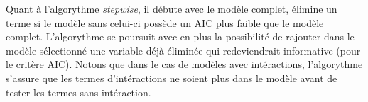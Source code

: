 Quant à l'algorythme \emph{stepwise}, il débute avec le modèle complet, élimine un terme si le modèle sans celui-ci possède un AIC plus faible que le modèle complet. L'algorythme se poursuit avec en plus la possibilité de rajouter dans le modèle sélectionné une variable déjà éliminée qui redeviendrait informative (pour le critère AIC).  
Notons que dans le cas de modèles avec intéractions, l'algorythme s'assure que les termes d'intéractions ne soient plus dans le modèle avant de tester les termes sans intéraction. 





